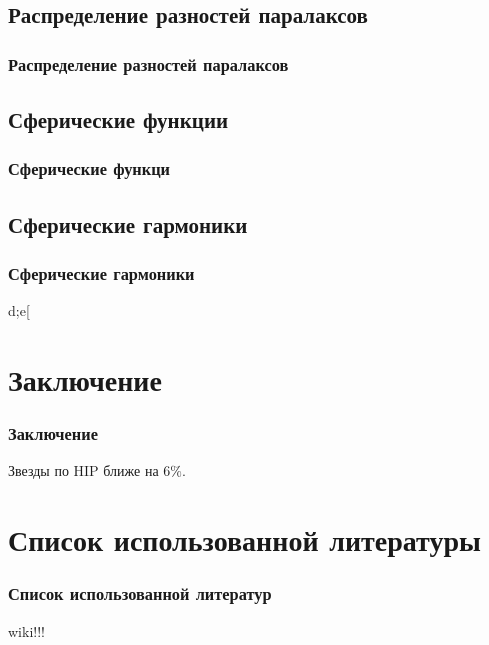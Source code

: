 \documentclass[14pt,aspectratio=43]{beamer}
\begin{document}
\subsection{Распределение разностей паралаксов}\label{sub:smthhealpix}
\begin{frame}[<alignment>]
\frametitle{Распределение разностей паралаксов}

\end{frame}	

\subsection{Сферические функции}\label{sistem}  
\begin{frame}[<alignment>]
\frametitle{Сферические функци}

\end{frame}	

\subsection{Сферические гармоники}\label{sistem}  
\begin{frame}[<alignment>]
\frametitle{Сферические гармоники}
d;e[

\end{frame}	

\section{Заключение}\label{conclusion}
\begin{frame}[<alignment>]
\frametitle{Заключение}
Звезды по HIP ближе на $6\%$.


\end{frame}	


\section{Список использованной литературы}\label{conclusionlit}
\begin{frame}[<alignment>]
\frametitle{Список использованной литератур}
wiki!!!
\end{frame}	
\end{document}
